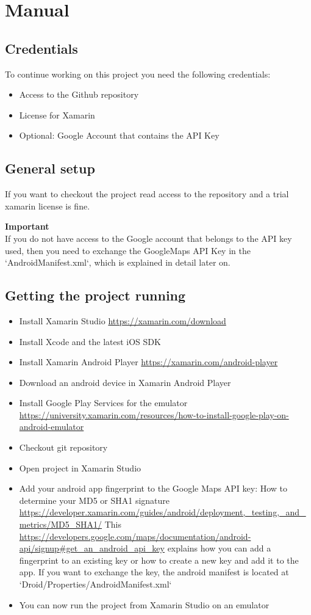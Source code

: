 \section{Manual}
\subsection{Credentials}
To continue working on this project you need the following credentials:
\begin{itemize}
\item Access to the Github repository
\item License for Xamarin 
\item Optional: Google Account that contains the API Key
\end{itemize}

\subsection{General setup}
If you want to checkout the project read access to the repository and a trial xamarin license is fine.

\textbf{Important}\\
If you do not have access to the Google account that belongs to the API key used, then you need to exchange the GoogleMaps API Key in the `AndroidManifest.xml`, which is explained in detail later on.

\subsection{Getting the project running}
\begin{itemize}
\item Install Xamarin Studio \url{https://xamarin.com/download}
\item Install Xcode and the latest iOS SDK
\item Install Xamarin Android Player \url{https://xamarin.com/android-player}
\item Download an android device in Xamarin Android Player
\item Install Google Play Services for the emulator \url{https://university.xamarin.com/resources/how-to-install-google-play-on-android-emulator}
\item Checkout git repository
\item Open project in Xamarin Studio
\item  Add your android app fingerprint to the Google Maps API key:
\subitem How to determine your MD5 or SHA1 signature \url{https://developer.xamarin.com/guides/android/deployment,_testing,_and_metrics/MD5_SHA1/}
\subitem This \url{https://developers.google.com/maps/documentation/android-api/signup#get_an_android_api_key} explains how you can add a fingerprint to an existing key or how to create a new key and add it to the app.
\subitem If you want to exchange the key, the android manifest is located at `Droid/Properties/AndroidManifest.xml`
\item  You can now run the project from Xamarin Studio on an emulator

\end{itemize}
 
